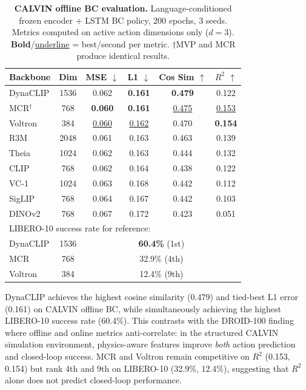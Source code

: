 \documentclass{article}
\newcommand{\methodname}{DynaCLIP}
\newcommand{\best}[1]{\textbf{#1}}
\newcommand{\second}[1]{\underline{#1}}
\begin{document}
\begin{table}[t]
\centering
\caption{\textbf{CALVIN offline BC evaluation.} Language-conditioned frozen encoder + LSTM BC policy, 200 epochs, 3 seeds. Metrics computed on active action dimensions only ($d{=}3$). \best{Bold}/\second{underline} = best/second per metric. $\dagger$MVP and MCR produce identical results.}
\label{tab:calvin_bc}
\small
\setlength{\tabcolsep}{4pt}
\begin{tabular}{@{}lccccc@{}}
\toprule
\textbf{Backbone} & \textbf{Dim} & \textbf{MSE $\downarrow$} & \textbf{L1 $\downarrow$} & \textbf{Cos Sim $\uparrow$} & \textbf{$R^2$ $\uparrow$} \\
\midrule
\methodname{} & 1536 & 0.062          & \best{0.161}   & \best{0.479}   & 0.122          \\
MCR$^\dagger$ & 768  & \best{0.060}   & \best{0.161}   & \second{0.475} & \second{0.153} \\
Voltron       & 384  & \second{0.060} & \second{0.162} & 0.470          & \best{0.154}  \\
R3M           & 2048 & 0.061          & 0.163          & 0.463          & 0.139          \\
Theia         & 1024 & 0.062          & 0.163          & 0.444          & 0.132          \\
CLIP          & 768  & 0.062          & 0.164          & 0.438          & 0.122          \\
VC-1          & 1024 & 0.063          & 0.168          & 0.442          & 0.112          \\
SigLIP        & 768  & 0.064          & 0.167          & 0.442          & 0.103          \\
DINOv2        & 768  & 0.067          & 0.172          & 0.423          & 0.051          \\
\midrule
\multicolumn{6}{l}{\small LIBERO-10 success rate for reference:} \\
\midrule
\methodname{} & 1536 & \multicolumn{4}{c}{\best{60.4\%} (1st)} \\
MCR           & 768  & \multicolumn{4}{c}{32.9\% (4th)} \\
Voltron       & 384  & \multicolumn{4}{c}{12.4\% (9th)} \\
\bottomrule
\end{tabular}
\vspace{-0.5em}
\end{table}

\methodname{} achieves the highest cosine similarity (0.479) and tied-best L1 error (0.161) on CALVIN offline BC, while simultaneously achieving the highest LIBERO-10 success rate (60.4\%). This contrasts with the DROID-100 finding where offline and online metrics anti-correlate: in the structured CALVIN simulation environment, physics-aware features improve \emph{both} action prediction and closed-loop success. MCR and Voltron remain competitive on $R^2$ (0.153, 0.154) but rank 4th and 9th on LIBERO-10 (32.9\%, 12.4\%), suggesting that $R^2$ alone does not predict closed-loop performance.
\end{document}
